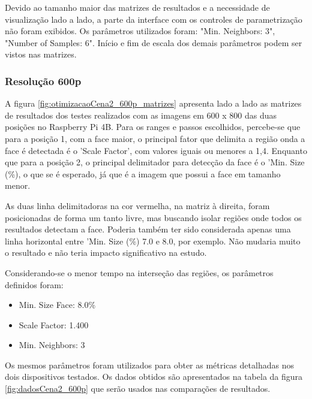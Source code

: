 Devido ao tamanho maior das matrizes de resultados e a necessidade de visualização lado a lado, a parte da interface com os controles de parametrização não foram exibidos. Os parâmetros utilizados foram: "Min. Neighbors: 3", "Number of Samples: 6". Início e fim de escala dos demais parâmetros podem ser vistos nas matrizes.

\subsubsection{Resolução 600p} \label{sssec:resolution2-1}

A figura \ref{fig:otimizacaoCena2_600p_matrizes} apresenta lado a lado as matrizes de resultados dos testes realizados com as imagens em 600 x 800 das duas posições no Raspberry Pi 4B. Para os ranges e passos escolhidos, percebe-se que para a posição 1, com a face maior, o principal fator que delimita a região onda a face é detectada é o 'Scale Factor', com valores iguais ou menores a 1,4. Enquanto que para a posição 2, o principal delimitador para detecção da face é o 'Min. Size (\%), o que se é esperado, já que é a imagem que possui a face em tamanho menor.

As duas linha delimitadoras na cor vermelha, na matriz à direita, foram posicionadas de forma um tanto livre, mas buscando isolar regiões onde todos os resultados detectam a face. Poderia também ter sido considerada apenas uma linha horizontal entre 'Min. Size (\%) 7.0 e 8.0, por exemplo. Não mudaria muito o resultado e não teria impacto significativo na estudo.

Considerando-se o menor tempo na interseção das regiões, os parâmetros definidos foram:
\begin{itemize}
    \SingleSpacing
    \item Min. Size Face: 8.0\%
    \item Scale Factor: 1.400
    \item Min. Neighbors: 3
\end{itemize}

Os mesmos parâmetros foram utilizados para obter as métricas detalhadas nos dois dispositivos testados. Os dados obtidos são apresentados na tabela da figura \ref{fig:dadosCena2_600p} que serão usados nas comparações de resultados.

